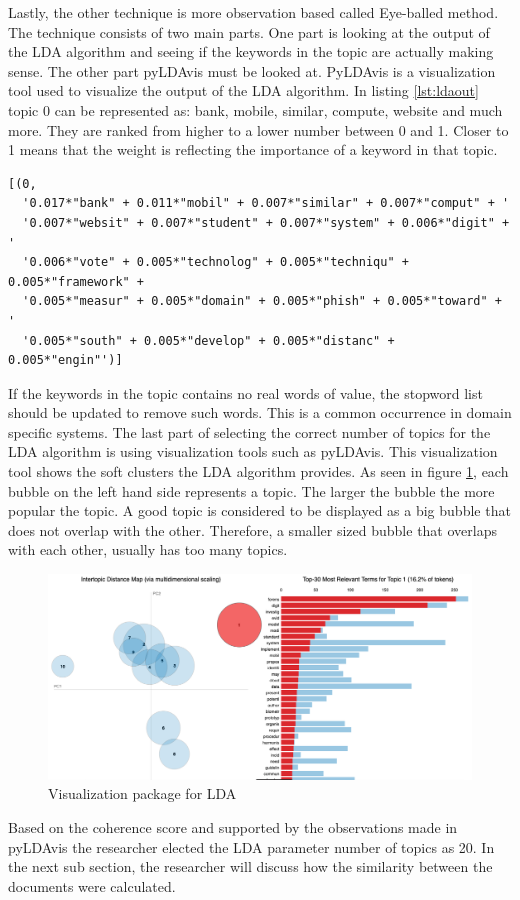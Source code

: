 Lastly, the other technique is more observation based called Eye-balled method. The technique consists of two main parts. One part is looking at the output of the LDA algorithm and seeing if the keywords in the topic are actually making sense. The other part pyLDAvis must be looked at. PyLDAvis is a visualization tool used to visualize the output of the LDA algorithm. 
In listing \ref{lst:ldaout} topic 0 can be represented as: bank, mobile, similar, compute, website and much more. They are ranked from higher to a lower number between 0 and 1. Closer to 1 means that the weight is reflecting the importance of a keyword in that topic.
\begin{lstlisting}[language=text, label={lst:ldaout}, caption=LDA topic output]
[(0,
  '0.017*"bank" + 0.011*"mobil" + 0.007*"similar" + 0.007*"comput" + '
  '0.007*"websit" + 0.007*"student" + 0.007*"system" + 0.006*"digit" + '
  '0.006*"vote" + 0.005*"technolog" + 0.005*"techniqu" + 0.005*"framework" +
  '0.005*"measur" + 0.005*"domain" + 0.005*"phish" + 0.005*"toward" + '
  '0.005*"south" + 0.005*"develop" + 0.005*"distanc" + 0.005*"engin"')]
\end{lstlisting}
If the keywords in the topic contains no real words of value, the stopword list should be updated to remove such words. This is a common occurrence in domain specific systems. 
The last part of selecting the correct number of topics for the LDA algorithm is using visualization tools such as pyLDAvis. This visualization tool shows the soft clusters the LDA algorithm provides. As seen in figure \ref{fig:LDAVIS}, each bubble on the left hand side represents a topic. The larger the bubble the more popular the topic. A good topic is considered to be displayed as a big bubble that does not overlap with the other. Therefore, a smaller sized bubble that overlaps with each other, usually has too many topics.
\begin{figure}[htbp]
\centering
\includegraphics[width=\textwidth]{./figures/LDAVIS.png}
\caption{Visualization package for LDA}
\label{fig:LDAVIS}
\end{figure}
Based on the coherence score and supported by the observations made in pyLDAvis the researcher elected the LDA parameter number of topics as 20. In the next sub section, the researcher will discuss how the similarity between the documents were calculated.

